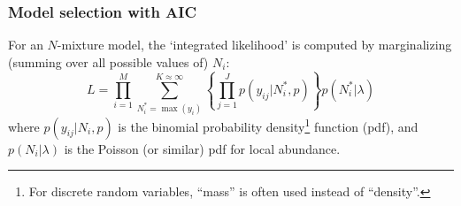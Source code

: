 \documentclass[color=usenames,dvipsnames]{beamer}\usepackage[]{graphicx}\usepackage[]{color}
\begin{document}
\bgroup
\let\oldfootnoterule\footnoterule
\def\footnoterule{\only<1->\oldfootnoterule}
\begin{frame}
  \frametitle{Model selection with AIC}
  For an $N$-mixture model, the `integrated likelihood' is computed by
  marginalizing (summing over all possible values of) $N_i$:
  \[
     L = \prod_{i=1}^M \sum_{N^*_i=\max(y_i)}^{K\approx \infty}
     \left\{\prod_{j=1}^J p(y_{ij}|N^*_i,p)\right\}p(N^*_i|\lambda)
  \]
  where $p(y_{ij}|N_i,p)$ is the binomial probability
  density\footnote<1->{\scriptsize For discrete random variables, 
    ``mass'' is often used instead of ``density''.} function 
  (pdf), and $p(N_i|\lambda)$ is the Poisson (or similar) pdf for
  local abundance. 
\end{frame}
\egroup
\end{document}
